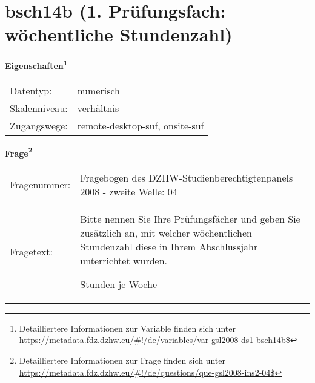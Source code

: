 
    \setcounter{footnote}{0}

    \vspace*{-1.8cm}
	\section{bsch14b (1. Prüfungsfach: wöchentliche Stundenzahl)}
	\label{section:bsch14b}



    \vspace*{0.5cm}
    \noindent\textbf{Eigenschaften\footnote{Detailliertere Informationen zur Variable finden sich unter
		\url{https://metadata.fdz.dzhw.eu/\#!/de/variables/var-gsl2008-ds1-bsch14b$}}}\\
	\begin{tabularx}{\hsize}{@{}lX}
	Datentyp: & numerisch \\
	Skalenniveau: & verhältnis \\
	Zugangswege: &
	  remote-desktop-suf, 
	  onsite-suf
 \\
    \end{tabularx}



				\vspace*{0.5cm}
                \noindent\textbf{Frage\footnote{Detailliertere Informationen zur Frage finden sich unter
		              \url{https://metadata.fdz.dzhw.eu/\#!/de/questions/que-gsl2008-ins2-04$}}}\\
				\begin{tabularx}{\hsize}{@{}lX}
					Fragenummer: &
					  Fragebogen des DZHW-Studienberechtigtenpanels 2008 - zweite Welle:
					  04
 \\
					Fragetext: & Bitte nennen Sie Ihre Prüfungsfächer und geben Sie zusätzlich an, mit welcher wöchentlichen Stundenzahl diese in Ihrem Abschlussjahr unterrichtet wurden.\par  Stunden je Woche \\
				\end{tabularx}





